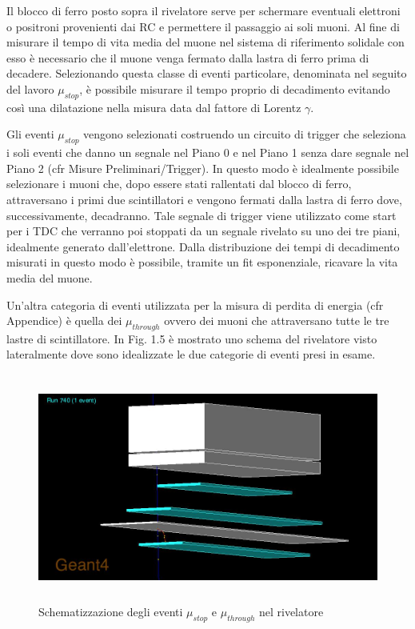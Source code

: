 \documentclass{standalone}
\begin{document}
Il blocco di ferro posto sopra il rivelatore serve per schermare eventuali elettroni o positroni provenienti dai RC e permettere il passaggio ai soli muoni.
Al fine di misurare il tempo di vita media del muone nel sistema di riferimento solidale con esso è necessario che il muone venga fermato dalla lastra di ferro prima di decadere. Selezionando questa classe di eventi particolare, denominata nel seguito del lavoro $\mu_{stop}$, è possibile misurare il tempo proprio di decadimento evitando così una dilatazione nella misura data dal fattore di Lorentz $\gamma$.

Gli eventi $\mu_{stop}$ vengono selezionati costruendo un circuito di trigger che seleziona i soli eventi che danno un segnale nel Piano 0 e nel Piano 1 senza dare segnale nel Piano 2 (cfr Misure Preliminari/Trigger). In questo modo è idealmente possibile selezionare i muoni che, dopo essere stati rallentati dal blocco di ferro, attraversano i primi due scintillatori e vengono fermati dalla lastra di ferro dove, successivamente, decadranno.
Tale segnale di trigger viene utilizzato come start per i TDC che verranno poi stoppati da un segnale rivelato su uno dei tre piani, idealmente generato dall'elettrone. Dalla distribuzione dei tempi di decadimento misurati in questo modo è possibile, tramite un fit esponenziale, ricavare la vita media del muone.

Un'altra categoria di eventi utilizzata per la misura di perdita di energia (cfr Appendice) è quella dei $\mu_{through}$ ovvero dei muoni che attraversano tutte le tre lastre di scintillatore. In Fig. 1.5 è mostrato uno schema del rivelatore visto lateralmente dove sono idealizzate le due categorie di eventi presi in esame.

\begin{figure}[H]
	\centering
  \includegraphics[width=13cm, height=7.5cm]{images/mu_stop.jpg}
	\caption{Schematizzazione degli eventi $\mu_{stop}$ e $\mu_{through}$ nel rivelatore}
\end{figure}
\end{document}
